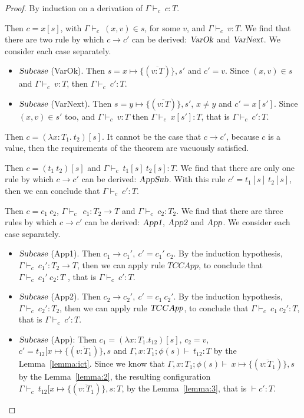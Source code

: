 \documentclass[preprint,authoryear,sort&compress,9pt,nocopyrightspace]{article}
\newcommand{\tto}{\longrightarrow}
\newcommand{\conf}[2][s]{(#2)[#1]}
\newcommand{\confx}[1]{#1 [\SubxD}
\newcommand{\SubxD}{x \mapsto \{(\overline{v:T_1})\},s}
\newcommand{\Subx}{x \mapsto \{(\overline{v:T})\},s'}
\newcommand{\Suby}{y \mapsto \{(\overline{v:T})\},s'}
\newcommand{\tyC}{{\Gamma \vdash_c \ }}
\newcommand{\envEC}{{\Gamma , x:T_1 ; \emt(s) \vdash \ }}
\newcommand{\absD}{\lambda x:T_1. \ t_2}
\newcommand{\emt}{\phi}
\begin{document}
\begin{proof} By induction on a derivation of $\tyC c : T$.


\begin{case}[TCVar]
Then $c = x[s]$, with $\tyC (x,v) \in s$, for some $v$, and $\tyC v:T$. We find that there are two rule by which $c \tto c'$ can be derived: $\textsl {VarOk}$ and $\textsl {VarNext}$. We consider each case separately.
\begin{itemize}
\item $\textsl{Subcase}$ (VarOk). Then $s = \Subx$ and $c' = v$. Since $(x,v) \in s$ and $\tyC v:T$, then $\tyC c' : T$.

\item $\textsl{Subcase}$ (VarNext). Then $s = \Suby$, $x \neq y$ and $c' = x[s']$. Since $(x,v) \in s'$ too, and $\tyC v:T$ then $\tyC x[s']:T $, that is $\tyC c' : T$. 
\end{itemize}
\end{case}

\begin{case} [TAbs]
Then $c = \conf{\absD}$. It cannot be the case that $c \tto c'$, because $c$ is a value, then the requirements of the theorem are vacuously satisfied. 
\end{case}

\begin{case}[TCApp]
Then $c = \conf{t_1 \ t_2}$ and $\tyC t_1[s] \ t_2[s]: T$. We find that there are only one rule by which $c \tto c'$ can be derived: $\textsl {AppSub}$. With this rule $c' = t_1[s] \ t_2[s]$, then we can conclude that $\tyC c' : T$. 
\end{case}

\begin{case} [TCCApp]
Then $c = c_1 \ c_2$, $\tyC \ c_1 : T_2 \to T$ and $\tyC c_2 : T_2$. We find that there are three rules by which $c \tto c'$ can be derived: $\textsl {App1}$, $\textsl {App2}$ and $\textsl {App}$. We consider each case separately.
\begin{itemize}

\item $\textsl{Subcase}$ (App1). Then $c_1 \tto c_1', \ c' = c_1' \ c_2$. By the induction hypothesis, $\tyC c_1' : T_2 \to T$, then we can apply rule $TCCApp$, to conclude that $\tyC c_1' \ c_2: T$ , that is $\tyC c' : T$.

\item $\textsl{Subcase}$ (App2). Then $c_2 \tto c_2', \ c' = c_1 \ c_2'$. By the induction hypothesis, $\tyC c_2' : T_2 $, then we can apply rule $\textsl TCCApp$, to conclude that $\tyC c_1 \ c_2' : T$, that is $\tyC c' : T$.

\item $\textsl{Subcase}$ (App): Then $c_1 = \conf{\lambda x:T_{1}.t_{12}}$, $c_2 = v$, $c' = \confx{t_{12}}$ and $\envEC t_{12}: T$ by the Lemma~\ref{lemma:ict}. Since we know that $\envEC \SubxD$ by the Lemma~\ref{lemma:2}, the resulting configuration $\tyC \confx{t_{12}}:T$, by the Lemma~\ref{lemma:3}, that is $\vdash c' : T$.
\end{itemize}
\end{case}
\end{proof}
\end{document}
